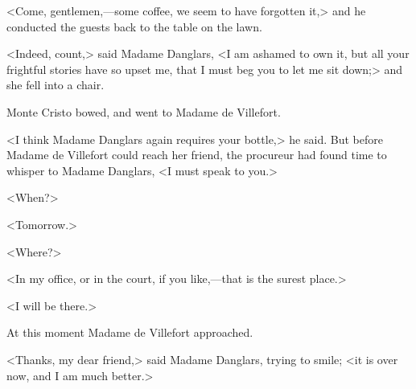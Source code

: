  <Come, gentlemen,—some coffee, we seem to have forgotten it,> and he conducted the guests back to the table on the lawn. 

 <Indeed, count,> said Madame Danglars, <I am ashamed to own it, but all your frightful stories have so upset me, that I must beg you to let me sit down;> and she fell into a chair. 

 Monte Cristo bowed, and went to Madame de Villefort. 

 <I think Madame Danglars again requires your bottle,> he said. But before Madame de Villefort could reach her friend, the procureur had found time to whisper to Madame Danglars, <I must speak to you.> 

 <When?> 

 <Tomorrow.> 

 <Where?> 

 <In my office, or in the court, if you like,—that is the surest place.> 

 <I will be there.> 

 At this moment Madame de Villefort approached. 

 <Thanks, my dear friend,> said Madame Danglars, trying to smile; <it is over now, and I am much better.> 